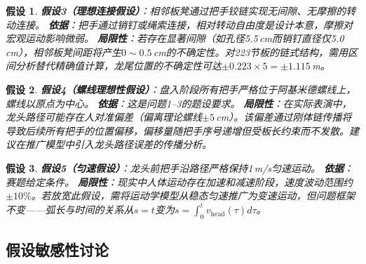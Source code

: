 \documentclass[12pt]{ctexart}
\newtheorem{assumption}{假设}
\begin{document}
\begin{assumption}
\textbf{假设3（理想连接假设）}：相邻板凳通过把手铰链实现无间隙、无摩擦的转动连接。
\textbf{依据}：把手通过销钉或绳索连接，相对转动自由度是设计本意，摩擦对宏观运动影响微弱。
\textbf{局限性}：若存在显著间隙（如孔径5.5\,cm而销钉直径仅5.0\,cm），相邻板凳间距将产生$0\sim 0.5$\,cm的不确定性。对223节板的链式结构，需用区间分析替代精确值计算，龙尾位置的不确定性可达$\pm 0.223\times 5 = \pm 1.115$\,m。
\end{assumption}

\begin{assumption}
\textbf{假设4（螺线理想性假设）}：盘入阶段所有把手严格位于阿基米德螺线上，螺线以原点为中心。
\textbf{依据}：这是问题1--3的题设要求。
\textbf{局限性}：在实际表演中，龙头路径可能存在人对准偏差（偏离理论螺线$\pm 5$\,cm）。该偏差通过刚体链传播将导致后续所有把手的位置偏移，偏移量随把手序号递增但受板长约束而不发散。建议在推广模型中引入龙头路径误差的传播分析。
\end{assumption}

\begin{assumption}
\textbf{假设5（匀速假设）}：龙头前把手沿路径严格保持1\,m/s匀速运动。
\textbf{依据}：赛题给定条件。
\textbf{局限性}：现实中人体运动存在加速和减速阶段，速度波动范围约$\pm 10\%$。若放宽此假设，需将运动学模型从稳态匀速推广为变速运动，但问题框架不变——弧长与时间的关系从$s=t$变为$s=\int_0^t v_{\text{head}}(\tau)d\tau$。
\end{assumption}

\subsection{假设敏感性讨论}
\end{document}
